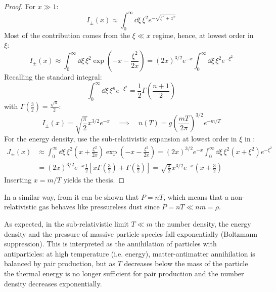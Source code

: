 \begin{proofbox}
  \begin{proof}
    For $ x \gg 1 $:
    \begin{equation*}
      I_\pm(x) \approx \int_0^\infty \dd \xi \, \xi^2 e^{-\sqrt{\xi^2 + x^2}}
    \end{equation*}
    Most of the contribution comes from the $ \xi \ll x $ regime, hence, at lowest order in $ \xi $:
    \begin{equation*}
      I_\pm(x) \approx \int_0^\infty \dd \xi \, \xi^2 \exp \left( - x - \frac{\xi^2}{2x} \right) = (2x)^{3/2} e^{-x} \int_0^\infty \dd \xi \, \xi^2 e^{-\xi^2}
    \end{equation*}
    Recalling the standard integral:
    \begin{equation}
      \int_0^\infty \dd \xi \, \xi^n e^{-\xi^2} = \frac{1}{2} \Gamma\left( \frac{n + 1}{2} \right)
    \end{equation}
    with $ \Gamma(\frac{3}{2}) = \frac{\sqrt{\pi}}{2} $:
    \begin{equation*}
      I_\pm(x) = \sqrt{\frac{\pi}{2}} x^{3/2} e^{-x}
      \quad \implies \quad
      n(T) = g \left( \frac{m T}{2\pi} \right)^{3/2} e^{-m/T}
    \end{equation*}
    For the energy density, use the sub-relativistic expansion at lowest order in $ \xi $ in :
    \begin{equation*}
      \begin{split}
        J_\pm(x)
        & \approx \int_0^\infty \dd \xi \, \xi^2 \left( x + \frac{\xi^2}{2x} \right) \exp \left( - x - \frac{\xi^2}{2x} \right) = (2x)^{3/2} e^{-x} \int_0^\infty \dd \xi \, \xi^2 \left( x + \xi^2 \right) e^{-\xi^2} \\
        & = (2x)^{3/2} e^{-x} \frac{1}{2} \left[ x \Gamma \left( \frac{3}{2} \right) + \Gamma \left( \frac{5}{2} \right) \right] = \sqrt{\frac{\pi}{2}} x^{3/2} e^{-x} \left( x + \frac{3}{2} \right)
      \end{split}
    \end{equation*}
    Inserting $ x = m / T $ yields the thesis.
  \end{proof}
\end{proofbox}

In a similar way, from  it can be shown that $ P = n T $, which means that a non-relativistic gas behaves like pressureless dust since $ P = n T \ll n m = \rho $.

As expected, in the sub-relativistic limit $ T \ll m $ the number density, the energy density and the pressure of massive particle species fall exponentially (Boltzmann suppression). This is interpreted as the annihilation of particles with antiparticles: at high temperature (i.e. energy), matter-antimatter annihilation is balanced by pair production, but as $ T $ decreases below the mass of the particle the thermal energy is no longer sufficient for pair production and the number density decreases exponentially.

